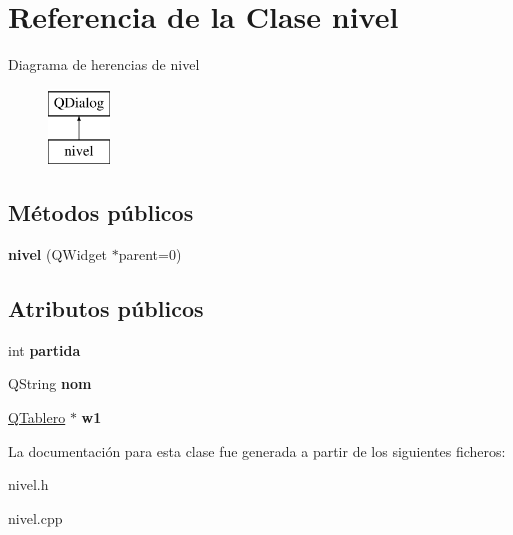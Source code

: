 \hypertarget{classnivel}{\section{Referencia de la Clase nivel}
\label{classnivel}
}
Diagrama de herencias de nivel\begin{figure}[H]
\begin{center}
\leavevmode
\includegraphics[height=2.000000cm]{classnivel}
\end{center}
\end{figure}
\subsection*{Métodos públicos}
\begin{DoxyCompactItemize}
\item 
\hypertarget{classnivel_add84530f153521109b3c306edf61db1d}{{\bfseries nivel} (Q\-Widget $\ast$parent=0)}\label{classnivel_add84530f153521109b3c306edf61db1d}

\end{DoxyCompactItemize}
\subsection*{Atributos públicos}
\begin{DoxyCompactItemize}
\item 
\hypertarget{classnivel_a63120c4c53d24284ac7fffd1d6382c7b}{int {\bfseries partida}}\label{classnivel_a63120c4c53d24284ac7fffd1d6382c7b}

\item 
\hypertarget{classnivel_aa075fa6ce0af7308326d8debfbbe4217}{Q\-String {\bfseries nom}}\label{classnivel_aa075fa6ce0af7308326d8debfbbe4217}

\item 
\hypertarget{classnivel_a98ab69240e6d5010ee344530c385753f}{\hyperlink{class_q_tablero}{Q\-Tablero} $\ast$ {\bfseries w1}}\label{classnivel_a98ab69240e6d5010ee344530c385753f}

\end{DoxyCompactItemize}


La documentación para esta clase fue generada a partir de los siguientes ficheros\-:\begin{DoxyCompactItemize}
\item 
nivel.\-h\item 
nivel.\-cpp\end{DoxyCompactItemize}

